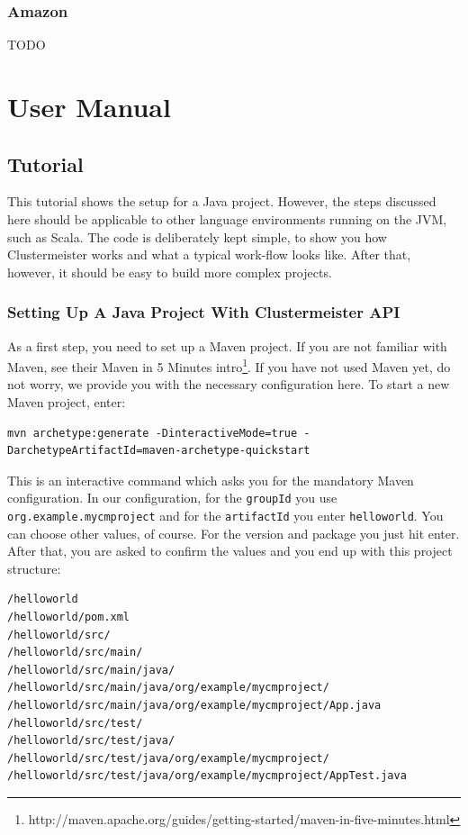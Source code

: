 \documentclass{article}
\begin{document}
\subsubsection{Amazon}

TODO

\section{User Manual}

\subsection{Tutorial}

\label{tutorial}

This tutorial shows the setup for a Java project. However, the steps discussed here should be applicable to other language environments running on the JVM, such as Scala. The code is deliberately kept simple, to show you how Clustermeister works and what a typical work-flow looks like. After that, however, it should be easy to build more complex projects.

\subsubsection{Setting Up A Java Project With Clustermeister API}

As a first step, you need to set up a Maven project. If you are not familiar with Maven, see their Maven in 5 Minutes intro\footnote{http://maven.apache.org/guides/getting-started/maven-in-five-minutes.html}. 
If you have not used Maven yet, do not worry, we provide you with the necessary configuration here. To start a new Maven project, enter:

\begin{lstlisting}[breaklines=true, backgroundcolor=\color{lbcolor}]
 mvn archetype:generate -DinteractiveMode=true -DarchetypeArtifactId=maven-archetype-quickstart
\end{lstlisting}

This is an interactive command which asks you for the mandatory Maven configuration. In our configuration, for the \texttt{groupId} you use \texttt{org.example.mycmproject} and for the \texttt{artifactId} you enter \texttt{helloworld}. You can choose other values, of course. For the version and package you just hit enter. After that, you are asked to confirm the values and you end up with this project structure:

\begin{lstlisting}[breaklines=true, backgroundcolor=\color{lbcolor}]
/helloworld
/helloworld/pom.xml
/helloworld/src/
/helloworld/src/main/
/helloworld/src/main/java/
/helloworld/src/main/java/org/example/mycmproject/
/helloworld/src/main/java/org/example/mycmproject/App.java
/helloworld/src/test/
/helloworld/src/test/java/
/helloworld/src/test/java/org/example/mycmproject/
/helloworld/src/test/java/org/example/mycmproject/AppTest.java
\end{lstlisting}
\end{document}
